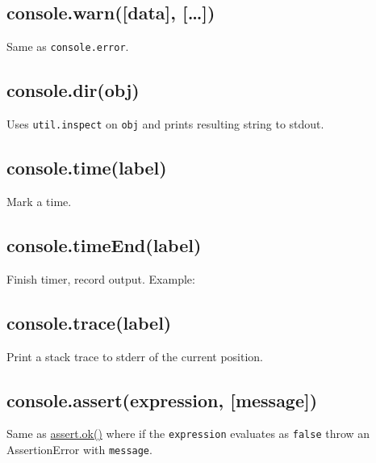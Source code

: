 \subsection{console.warn({[}data{]}, {[}\ldots{}{]})}

Same as \texttt{console.error}.

\subsection{console.dir(obj)}

Uses \texttt{util.inspect} on \texttt{obj} and prints resulting string
to stdout.

\subsection{console.time(label)}

Mark a time.

\subsection{console.timeEnd(label)}

Finish timer, record output. Example:

\begin{Shaded}
\begin{Highlighting}[]
\NormalTok{(}\NormalTok{);}
 \NormalTok{(} 
  \NormalTok{;}
\NormalTok{\}}
\NormalTok{(}\NormalTok{);}
\end{Highlighting}
\end{Shaded}

\subsection{console.trace(label)}

Print a stack trace to stderr of the current position.

\subsection{console.assert(expression, {[}message{]})}

Same as
\href{assert.html\#assert\_assert\_value\_message\_assert\_ok\_value\_message}{assert.ok()}
where if the \texttt{expression} evaluates as \texttt{false} throw an
AssertionError with \texttt{message}.
